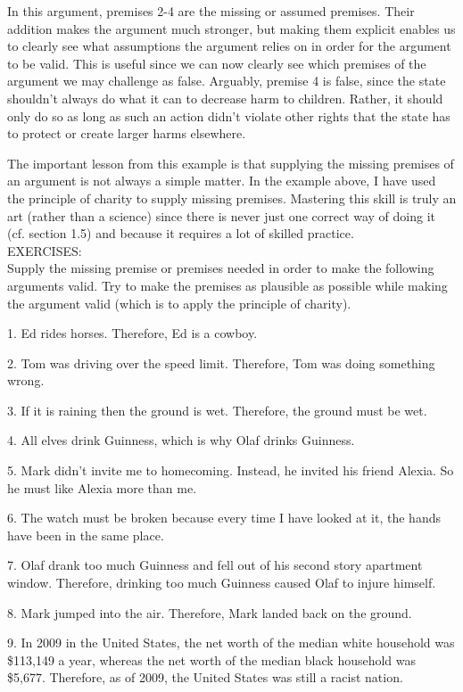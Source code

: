 In this argument, premises 2-4 are the missing or assumed premises. Their
addition makes the argument much stronger, but making them explicit enables
us to clearly see what assumptions the argument relies on in order for the
argument to be valid. This is useful since we can now clearly see which premises
of the argument we may challenge as false. Arguably, premise 4 is false, since
the state shouldn't always do what it can to decrease harm to children. Rather,
it should only do so as long as such an action didn't violate other rights that the
state has to protect or create larger harms elsewhere.

The important lesson from this example is that supplying the missing premises
of an argument is not always a simple matter. In the example above, I have
used the principle of charity to supply missing premises. Mastering this skill is
truly an art (rather than a science) since there is never just one correct way of
doing it (cf. section 1.5) and because it requires a lot of skilled practice. \\



EXERCISES: \\
 
Supply the missing premise or premises needed in order to
make the following arguments valid. Try to make the premises as
plausible as possible while making the argument valid (which is to apply
the principle of charity).

1. Ed rides horses. Therefore, Ed is a cowboy.

2. Tom was driving over the speed limit. Therefore, Tom was doing
something wrong.

3. If it is raining then the ground is wet. Therefore, the ground must be
wet.

4. All elves drink Guinness, which is why Olaf drinks Guinness.

5. Mark didn't invite me to homecoming. Instead, he invited his friend
Alexia. So he must like Alexia more than me.

6. The watch must be broken because every time I have looked at it, the
hands have been in the same place.

7. Olaf drank too much Guinness and fell out of his second story
apartment window. Therefore, drinking too much Guinness caused
Olaf to injure himself.

8. Mark jumped into the air. Therefore, Mark landed back on the
ground.

9. In 2009 in the United States, the net worth of the median white
household was \$113,149 a year, whereas the net worth of the median
black household was \$5,677. Therefore, as of 2009, the United States
was still a racist nation.

